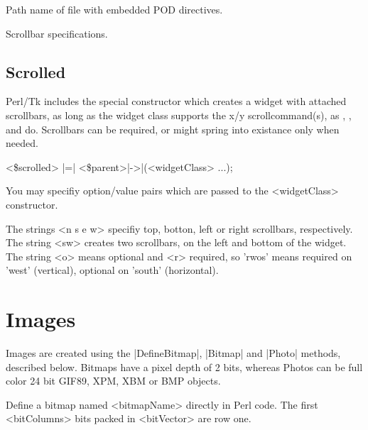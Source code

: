 \vskip5pt

\begin{enum}{1cm}

Path name of file with embedded POD directives.

Scrollbar specifications.

\end{enum}

\subsection*{Scrolled}

Perl/Tk includes the special constructor  which
creates a widget with attached scrollbars, as long as the widget class
supports the x/y scrollcommand(s), as ,
,  and  do.  Scrollbars can be required, or might
spring into existance only when needed.

\quad \quad <\$scrolled> |=| <\$parent>|->|(<widgetClass> ...);

You may specifiy option/value pairs which are passed to the <widgetClass>
constructor.

\vskip5pt
\begin{enum}{1cm}

The strings <n s e w> specifiy top, botton, left or right scrollbars,
respectively.  The string <sw> creates two scrollbars, on the left and bottom of
the widget.  The string <o> means optional and <r> required, so
'rwos' means required on 'west' (vertical), optional on 'south' (horizontal).

\end{enum}


\section{Images}

Images are created using the |DefineBitmap|, |Bitmap| and |Photo| methods, described below.
Bitmaps have a pixel depth of 2 bits, whereas Photos can be full color 24 bit
GIF89, XPM, XBM or BMP objects.

\begin{enum}{1cm}

Define a bitmap named <bitmapName> directly in Perl code.  The first <bitColumns> bits
packed in <bitVector> are row one.

\end{enum}


